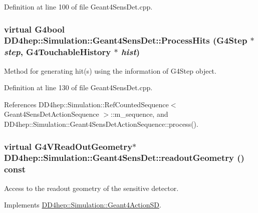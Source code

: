 Definition at line 100 of file Geant4SensDet.cpp.\hypertarget{class_d_d4hep_1_1_simulation_1_1_geant4_sens_det_aafdd578f5e7d1ac5885a715b9a101567}{
\subsubsection[{ProcessHits}]{\setlength{\rightskip}{0pt plus 5cm}virtual G4bool DD4hep::Simulation::Geant4SensDet::ProcessHits (G4Step $\ast$ {\em step}, \/  G4TouchableHistory $\ast$ {\em hist})}}
\label{class_d_d4hep_1_1_simulation_1_1_geant4_sens_det_aafdd578f5e7d1ac5885a715b9a101567}


Method for generating hit(s) using the information of G4Step object. 

Definition at line 130 of file Geant4SensDet.cpp.

References DD4hep::Simulation::RefCountedSequence$<$ Geant4SensDetActionSequence $>$::m\_\-sequence, and DD4hep::Simulation::Geant4SensDetActionSequence::process().\hypertarget{class_d_d4hep_1_1_simulation_1_1_geant4_sens_det_a93a6d9cf9b58769cc5404762690cb3bc}{
\subsubsection[{readoutGeometry}]{\setlength{\rightskip}{0pt plus 5cm}virtual G4VReadOutGeometry$\ast$ DD4hep::Simulation::Geant4SensDet::readoutGeometry () const}}
\label{class_d_d4hep_1_1_simulation_1_1_geant4_sens_det_a93a6d9cf9b58769cc5404762690cb3bc}


Access to the readout geometry of the sensitive detector. 

Implements \hyperlink{class_d_d4hep_1_1_simulation_1_1_geant4_action_s_d_abf432e0098d25759837ddc2af5dc6c16}{DD4hep::Simulation::Geant4ActionSD}.

